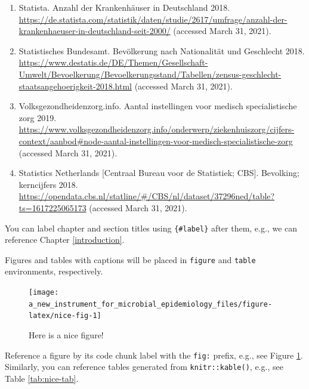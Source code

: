 \documentclass[
]{book}
\begin{document}
\begin{enumerate}
\item
  Statista. Anzahl der Krankenhäuser in Deutschland 2018. \url{https://de.statista.com/statistik/daten/studie/2617/umfrage/anzahl-der-krankenhaeuser-in-deutschland-seit-2000/} (accessed March 31, 2021).
\item
  Statistisches Bundesamt. Bevölkerung nach Nationalität und Geschlecht 2018. \url{https://www.destatis.de/DE/Themen/Gesellschaft-Umwelt/Bevoelkerung/Bevoelkerungsstand/Tabellen/zensus-geschlecht-staatsangehoerigkeit-2018.html} (accessed March 31, 2021).
\item
  Volksgezondheidenzorg.info. Aantal instellingen voor medisch specialistische zorg 2019. \url{https://www.volksgezondheidenzorg.info/onderwerp/ziekenhuiszorg/cijfers-context/aanbod\#node-aantal-instellingen-voor-medisch-specialistische-zorg} (accessed March 31, 2021).
\item
  Statistics Netherlands {[}Centraal Bureau voor de Statistiek; CBS{]}. Bevolking; kerncijfers 2018. \url{https://opendata.cbs.nl/statline/\#/CBS/nl/dataset/37296ned/table?ts=1617225065173} (accessed March 31, 2021).
\end{enumerate}

You can label chapter and section titles using \texttt{\{\#label\}} after them, e.g., we can reference Chapter \ref{introduction}.

Figures and tables with captions will be placed in \texttt{figure} and \texttt{table} environments, respectively.

\begin{figure}

{\centering \texttt{[image: a\_new\_instrument\_for\_microbial\_epidemiology\_files/figure-latex/nice-fig-1]} 

}

\caption{Here is a nice figure!}\label{fig:nice-fig}
\end{figure}

Reference a figure by its code chunk label with the \texttt{fig:} prefix, e.g., see Figure \ref{fig:nice-fig}. Similarly, you can reference tables generated from \texttt{knitr::kable()}, e.g., see Table \ref{tab:nice-tab}.
\end{document}
